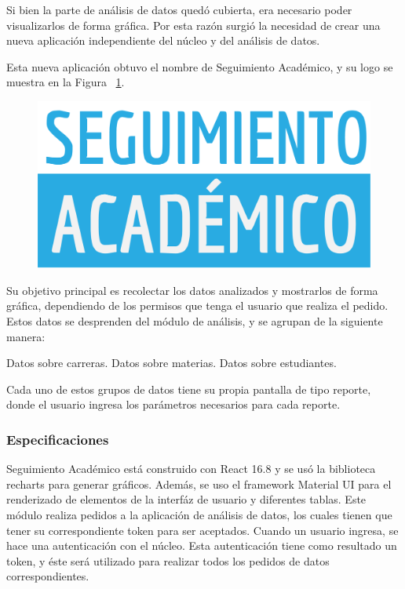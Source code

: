 Si bien la parte de análisis de datos quedó cubierta, era necesario poder visualizarlos de forma gráfica. Por esta razón surgió la necesidad de crear una nueva aplicación independiente del núcleo y del análisis de datos.

Esta nueva aplicación obtuvo el nombre de Seguimiento Académico, y su logo se muestra en la Figura ~\ref{fig:seguimiento-academico-logo}.

\begin{figure}[h!]
  \centering
    \includegraphics[scale=0.5]{images/seguimiento-academico/seguimiento-academico-blanco.png}
  \label{fig:seguimiento-academico-logo}
\end{figure}

Su objetivo principal es recolectar los datos analizados y mostrarlos de forma gráfica, dependiendo de los permisos que tenga el usuario que realiza el pedido.
Estos datos se desprenden del módulo de análisis, y se agrupan de la siguiente manera:

\begin{outline}
\2 Datos sobre carreras.
\2 Datos sobre materias.
\2 Datos sobre estudiantes.
\end{outline}

Cada uno de estos grupos de datos tiene su propia pantalla de tipo reporte, donde el usuario ingresa los parámetros necesarios para cada reporte.


\subsubsection{Especificaciones}

Seguimiento Académico está construido con React 16.8 y se usó la biblioteca recharts para generar gráficos. Además, se uso el framework Material UI para el renderizado de elementos de la interfáz de usuario y diferentes tablas.
Este módulo realiza pedidos a la aplicación de análisis de datos, los cuales tienen que tener su correspondiente token para ser aceptados.
Cuando un usuario ingresa, se hace una autenticación con el núcleo. Esta autenticación tiene como resultado un token, y éste será utilizado para realizar todos los pedidos de datos correspondientes.


